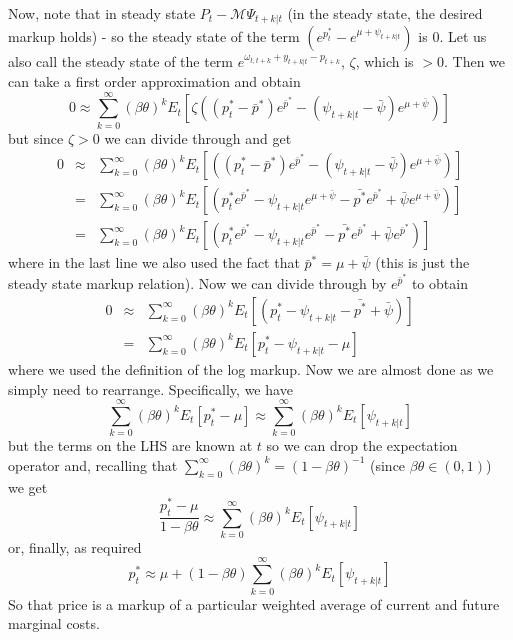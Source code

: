 \documentclass[authoryear,11pt]{elsarticle}
\begin{document}
Now, note that in steady state $P_{t}-\mathcal{M} \Psi_{t+k|t}$ (in the steady state, the desired markup holds) - so the steady state of the term $\left( e^{p_{t}^{\ast}} - e^{\mu + \psi_{t+k|t}} \right)$ is $0$. Let us also call the steady state of the term  $e^{\omega_{t,t+k} + y_{t+k|t} - p_{t+k}}$, $\zeta$, which is $>0$. Then we can take a first order approximation and obtain
\[
0 \approx \sum\limits_{k=0}^{\infty} (\beta \theta)^{k} E_{t} \left[ \zeta \left( (p_{t}^{\ast} - \bar{p}^{\ast}) e^{\bar{p}^{\ast}} - (\psi_{t+k|t} - \bar{\psi}) e^{\mu + \bar{\psi}} \right) \right]
\]
but since $\zeta>0$ we can divide through and get
\begin{eqnarray*}
0 &\approx& \sum\limits_{k=0}^{\infty} (\beta \theta)^{k} E_{t} \left[ \left( (p_{t}^{\ast} - \bar{p}^{\ast}) e^{\bar{p}^{\ast}} - (\psi_{t+k|t} - \bar{\psi}) e^{\mu + \bar{\psi}} \right) \right] \\
 &=& \sum\limits_{k=0}^{\infty} (\beta \theta)^{k} E_{t} \left[ \left( p_{t}^{\ast} e^{\bar{p}^{\ast}} - \psi_{t+k|t}e^{\mu + \bar{\psi}} - \bar{p^{\ast}} e^{\bar{p}^{\ast}} + \bar{\psi}e^{\mu + \bar{\psi}}\right) \right] \\
 &=& \sum\limits_{k=0}^{\infty} (\beta \theta)^{k} E_{t} \left[ \left( p_{t}^{\ast} e^{\bar{p}^{\ast}} - \psi_{t+k|t}e^{\bar{p}^{\ast}} - \bar{p^{\ast}} e^{\bar{p}^{\ast}} + \bar{\psi}e^{\bar{p}^{\ast}}\right) \right]
\end{eqnarray*}
where in the last line we also used the fact that $\bar{p}^{\ast} = \mu + \bar{\psi}$ (this is just the steady state markup relation). Now we can divide through by $e^{\bar{p}^{\ast}}$ to obtain
\begin{eqnarray*}
0 &\approx& \sum\limits_{k=0}^{\infty} (\beta \theta)^{k} E_{t} \left[ \left( p_{t}^{\ast} - \psi_{t+k|t} - \bar{p^{\ast}} + \bar{\psi} \right) \right] \\
 &=& \sum\limits_{k=0}^{\infty} (\beta \theta)^{k} E_{t} \left[ p_{t}^{\ast} - \psi_{t+k|t} - \mu \right] 
\end{eqnarray*}
where we used the definition of the log markup. Now we are almost done as we simply need to rearrange. Specifically, we have
\[
 \sum\limits_{k=0}^{\infty} (\beta \theta)^{k} E_{t} \left[ p_{t}^{\ast} - \mu \right]  \approx \sum\limits_{k=0}^{\infty} (\beta \theta)^{k} E_{t} \left[ \psi_{t+k|t} \right] 
\]
but the terms on the LHS are known at $t$ so we can drop the expectation operator and, recalling that $\sum\limits_{k=0}^{\infty} (\beta \theta)^{k} = (1-\beta \theta)^{-1}$ (since $\beta \theta \in (0,1)$) we get
\[
 \frac{p_{t}^{\ast} - \mu}{1-\beta \theta}  \approx \sum\limits_{k=0}^{\infty} (\beta \theta)^{k} E_{t} \left[ \psi_{t+k|t} \right] 
\]
or, finally, as required
\[
p_{t}^{\ast} \approx  \mu + (1-\beta \theta) \sum\limits_{k=0}^{\infty} (\beta \theta)^{k} E_{t} \left[ \psi_{t+k|t} \right] 
\]
So that price is a markup of a particular weighted average of current and future marginal costs.
\end{document}

